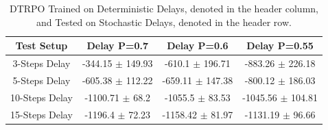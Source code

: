             \begin{table}[t]
                \centering
                \begin{tabular}{@{}cccc@{}}
                \toprule
                \multicolumn{1}{c}{Test Setup} & Delay P=0.7           & Delay P=0.6            & Delay P=0.55          \\ \midrule
                3-Steps Delay                  & -344.15 $\pm$ 149.93  & -610.1 $\pm$ 196.71    & -883.26 $\pm$ 226.18  \\
                5-Steps Delay                  & -605.38 $\pm$ 112.22  & -659.11 $\pm$ 147.38   & -800.12 $\pm$ 186.03  \\
                10-Steps Delay                 & -1100.71 $\pm$ 68.2   & -1055.5 $\pm$ 83.53    & -1045.56 $\pm$ 104.81 \\
                15-Steps Delay                 & -1196.4 $\pm$ 72.23   & -1158.42 $\pm$ 81.97   & -1131.19 $\pm$ 96.66  \\ \bottomrule
                \end{tabular}
                \centering
                \caption{DTRPO Trained on Deterministic Delays, denoted in the header column, and Tested on Stochastic Delays, denoted in the header row.}
            \end{table}
            
            \begin{table}[t]
                \centering
                \caption{L2TRPO Trained on Deterministic Delays, denoted in the header column, and Tested on Deterministic Delays, denoted in the header row.}
            \end{table}
            
